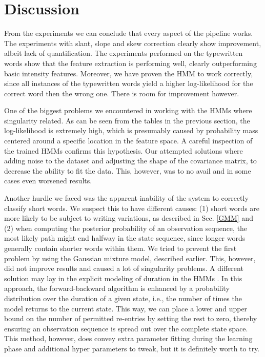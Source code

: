 \documentclass[conference]{IEEEtran}
\begin{document}
\section{Discussion} \label{discussion}
From the experiments we can conclude that every aspect of the pipeline works. The experiments with slant, slope and skew correction clearly show improvement, albeit lack of quantification. The experiments performed on the typewritten words show that the feature extraction is performing well, clearly outperforming basic intensity features. Moreover, we have proven the HMM to work correctly, since all instances of the typewritten words yield a higher log-likelihood for the correct word then the wrong one. There is room for improvement however.

One of the biggest problems we encountered in working with the HMMs where singularity related. As can be seen from the tables in the previous section, the log-likelihood is extremely high, which is presumably caused by probability mass centered around a specific location in the feature space. A careful inspection of the trained HMMs confirms this hypothesis. Our attempted solutions where adding noise to the dataset and adjusting the shape of the covariance matrix, to decrease the ability to fit the data. This, however, was to no avail and in some cases even worsened results.

Another hurdle we faced was the apparent inability of the system to correctly classify short words. We suspect this to have different causes: (1) short words are more likely to be subject to writing variations, as described in Sec. \ref{GMM} and (2) when computing the posterior probability of an observation sequence, the most likely path might end halfway in the state sequence, since longer words generally contain shorter words within them. We tried to prevent the first problem by using the Gaussian mixture model, described earlier. This, however, did not improve results and caused a lot of singularity problems. A different solution may lay in the explicit modeling of duration in the HMMs \cite{conf/tsd/TothK05}\cite{journals/tsp/YuK06}. In this approach, the forward-backward algorithm is enhanced by a probability distribution over the duration of a given state, i.e., the number of times the model returns to the current state. This way, we can place a lower and upper bound on the number of permitted re-entries by setting the rest to zero, thereby ensuring an observation sequence is spread out over the complete state space. This method, however, does convey extra parameter fitting during the learning phase and additional hyper parameters to tweak, but it is definitely worth to try.
\end{document}
